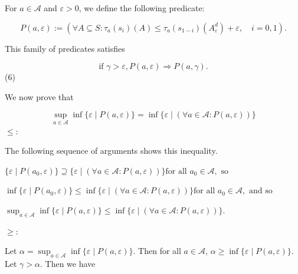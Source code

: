  
For $a\in\mathcal{A}$ and $\varepsilon>0$, we define the following predicate:\par
  
\par  \quad  \[P(a,\varepsilon):=(\forall A\subseteq S:\tau_{a}(s_{i})(A)\leq\tau_{a}(s_{1-i})(A^{d}_{\varepsilon})+\varepsilon,\quad i=0,1).\]\quad  \quad  
  
This family of predicates satisfies\par
  
\par  \quad  \[\mbox{if }\gamma>\varepsilon,P(a,\varepsilon)\Rightarrow P(a,\gamma).\]\quad  \quad  (6)\quad  
  
We now prove that\par
  
\par  \quad  \[\sup_{a\in\mathcal{A}}\inf\{\varepsilon\mid P(a,\varepsilon)\}=\inf\{\varepsilon\mid(\forall a\in\mathcal{A}:P(a,\varepsilon))\}\]\quad  \quad  
   $\leq$:  
 
The following sequence of arguments shows this inequality.\par
  
\par  \quad  $\displaystyle\{\varepsilon\mid P(a_{0},\varepsilon)\}$\quad  $\displaystyle\supseteq\{\varepsilon\mid(\forall a\in\mathcal{A}:P(a,\varepsilon))\}$\quad  $\displaystyle\mbox{for all }a_{0}\in\mathcal{A},\mbox{ so}$\quad  \quad  
 
\par  \quad  $\displaystyle\inf\{\varepsilon\mid P(a_{0},\varepsilon)\}$\quad  $\displaystyle\leq\inf\{\varepsilon\mid(\forall a\in\mathcal{A}:P(a,\varepsilon))\}$\quad  $\displaystyle\mbox{for all }a_{0}\in\mathcal{A},\mbox{ and so}$\quad  \quad  
 
\par  \quad  $\displaystyle\sup_{a\in\mathcal{A}}\inf\{\varepsilon\mid P(a,\varepsilon)\}$\quad  $\displaystyle\leq\inf\{\varepsilon\mid(\forall a\in\mathcal{A}:P(a,\varepsilon))\}.$\quad  \quad  
  
  $\geq$:  
 
Let $\alpha=\sup_{a\in\mathcal{A}}\inf\{\varepsilon\mid P(a,\varepsilon)\}.$ Then for all $a\in\mathcal{A}$, $\alpha\geq\inf\{\varepsilon\mid P(a,\varepsilon)\}.$ Let $\gamma>\alpha$. Then we have\par
  
